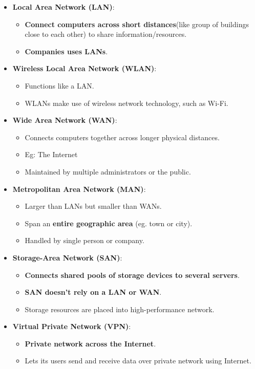 \begin{flushleft}
\begin{itemize}
	\item \textbf{Local Area Network (LAN)}:
	\begin{itemize}
		\item \textbf{Connect computers across short distances}(like group of buildings close to each other) to share information/resources.
		\item \textbf{Companies uses LANs}.
	\end{itemize}
	\bigskip\bigskip
	\item \textbf{Wireless Local Area Network (WLAN)}:
	\begin{itemize}
		\item Functions like a LAN.
		\item WLANs make use of wireless network technology, such as Wi-Fi.
	\end{itemize}
	\bigskip\bigskip
		\item \textbf{Wide Area Network (WAN)}:
	\begin{itemize}
		\item Connects computers together across longer physical distances.
		\item Eg: The Internet
		\item Maintained by multiple administrators or the public.
	\end{itemize}
	\bigskip\bigskip
	\item \textbf{Metropolitan Area Network (MAN)}:
	\begin{itemize}
		\item Larger than LANs but smaller than WANs.
		\item Span an \textbf{entire geographic area} (eg. town or city).
		\item Handled by single person or company.
	\end{itemize}
	\bigskip\bigskip
	\item \textbf{Storage-Area Network (SAN)}:
	\begin{itemize}
		\item \textbf{Connects shared pools of storage devices to several servers}.
		\item \textbf{SAN doesn't rely on a LAN or WAN}.
		\item Storage resources are placed into high-performance network.
	\end{itemize}
	\bigskip\bigskip
	\item \textbf{Virtual Private Network (VPN)}:
	\begin{itemize}
		\item \textbf{Private network across the Internet}.
		\item Lets its users send and receive data over private network using Internet.
	\end{itemize}



\end{itemize}


\end{flushleft}
\newpage



